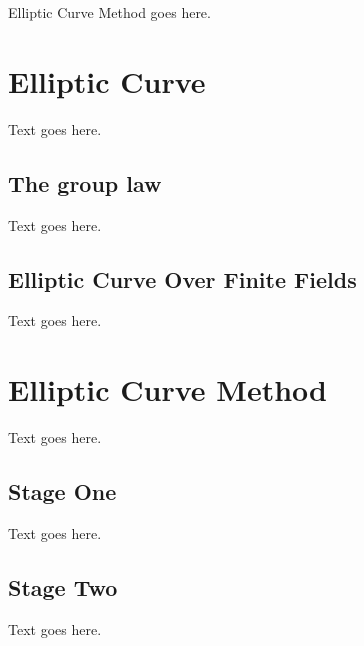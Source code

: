 Elliptic Curve Method goes here.
\section{Elliptic Curve}
Text goes here.
\subsection{The group law}
Text goes here.

\subsection{Elliptic Curve Over Finite Fields}
Text goes here.

\section{Elliptic Curve Method}
Text goes here.

\subsection{Stage One}
Text goes here.

\subsection{Stage Two}
Text goes here.

